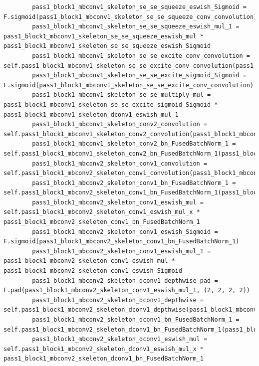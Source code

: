 \documentclass{fisatprojectfinal}
\begin{document}
\begin{appendices}
\begin{lstlisting}
        pass1_block1_mbconv1_skeleton_se_se_squeeze_eswish_Sigmoid = F.sigmoid(pass1_block1_mbconv1_skeleton_se_se_squeeze_conv_convolution)
        pass1_block1_mbconv1_skeleton_se_se_squeeze_eswish_mul_1 = pass1_block1_mbconv1_skeleton_se_se_squeeze_eswish_mul * pass1_block1_mbconv1_skeleton_se_se_squeeze_eswish_Sigmoid
        pass1_block1_mbconv1_skeleton_se_se_excite_conv_convolution = self.pass1_block1_mbconv1_skeleton_se_se_excite_conv_convolution(pass1_block1_mbconv1_skeleton_se_se_squeeze_eswish_mul_1)
        pass1_block1_mbconv1_skeleton_se_se_excite_sigmoid_Sigmoid = F.sigmoid(pass1_block1_mbconv1_skeleton_se_se_excite_conv_convolution)
        pass1_block1_mbconv1_skeleton_se_se_multiply_mul = pass1_block1_mbconv1_skeleton_se_se_excite_sigmoid_Sigmoid * pass1_block1_mbconv1_skeleton_dconv1_eswish_mul_1
        pass1_block1_mbconv1_skeleton_conv2_convolution = self.pass1_block1_mbconv1_skeleton_conv2_convolution(pass1_block1_mbconv1_skeleton_se_se_multiply_mul)
        pass1_block1_mbconv1_skeleton_conv2_bn_FusedBatchNorm_1 = self.pass1_block1_mbconv1_skeleton_conv2_bn_FusedBatchNorm_1(pass1_block1_mbconv1_skeleton_conv2_convolution)
        pass1_block1_mbconv2_skeleton_conv1_convolution = self.pass1_block1_mbconv2_skeleton_conv1_convolution(pass1_block1_mbconv1_skeleton_conv2_bn_FusedBatchNorm_1)
        pass1_block1_mbconv2_skeleton_conv1_bn_FusedBatchNorm_1 = self.pass1_block1_mbconv2_skeleton_conv1_bn_FusedBatchNorm_1(pass1_block1_mbconv2_skeleton_conv1_convolution)
        pass1_block1_mbconv2_skeleton_conv1_eswish_mul = self.pass1_block1_mbconv2_skeleton_conv1_eswish_mul_x * pass1_block1_mbconv2_skeleton_conv1_bn_FusedBatchNorm_1
        pass1_block1_mbconv2_skeleton_conv1_eswish_Sigmoid = F.sigmoid(pass1_block1_mbconv2_skeleton_conv1_bn_FusedBatchNorm_1)
        pass1_block1_mbconv2_skeleton_conv1_eswish_mul_1 = pass1_block1_mbconv2_skeleton_conv1_eswish_mul * pass1_block1_mbconv2_skeleton_conv1_eswish_Sigmoid
        pass1_block1_mbconv2_skeleton_dconv1_depthwise_pad = F.pad(pass1_block1_mbconv2_skeleton_conv1_eswish_mul_1, (2, 2, 2, 2))
        pass1_block1_mbconv2_skeleton_dconv1_depthwise = self.pass1_block1_mbconv2_skeleton_dconv1_depthwise(pass1_block1_mbconv2_skeleton_dconv1_depthwise_pad)
        pass1_block1_mbconv2_skeleton_dconv1_bn_FusedBatchNorm_1 = self.pass1_block1_mbconv2_skeleton_dconv1_bn_FusedBatchNorm_1(pass1_block1_mbconv2_skeleton_dconv1_depthwise)
        pass1_block1_mbconv2_skeleton_dconv1_eswish_mul = self.pass1_block1_mbconv2_skeleton_dconv1_eswish_mul_x * pass1_block1_mbconv2_skeleton_dconv1_bn_FusedBatchNorm_1

\end{lstlisting}
\end{appendices}
\end{document}
